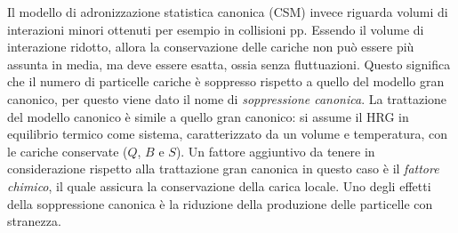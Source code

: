 Il modello di adronizzazione statistica canonica (CSM) invece riguarda volumi di interazioni minori ottenuti per esempio in collisioni pp.
Essendo il volume di interazione ridotto, allora la conservazione delle cariche non può essere più assunta in media, ma deve essere esatta, ossia senza fluttuazioni.
Questo significa che il numero di particelle cariche è soppresso rispetto a quello del modello gran canonico, per questo viene dato il nome di \emph{soppressione canonica}.
La trattazione del modello canonico è simile a quello gran canonico: si assume il HRG in equilibrio termico come sistema, caratterizzato da un volume e temperatura, con le cariche conservate ($Q$, $B$ e $S$).
Un fattore aggiuntivo da tenere in considerazione rispetto alla trattazione gran canonica in questo caso è il \emph{fattore chimico}, il quale assicura la conservazione della carica locale.
Uno degli effetti della soppressione canonica è la riduzione della produzione delle particelle con stranezza.\\

